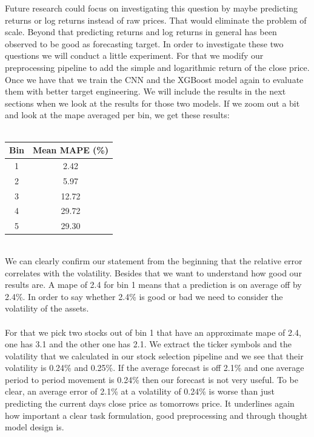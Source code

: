 \documentclass[a4paper,12pt]{report}
\begin{document}
Future research could focus on investigating this question by maybe predicting returns or log returns instead of raw prices. That would eliminate the problem of scale. Beyond that predicting returns and log returns in general has been observed to be good as forecasting target. In order to investigate these two questions we will conduct a little experiment. For that we modify our preprocessing pipeline to add the simple and logarithmic return of the close price. Once we have that we train the CNN and the XGBoost model again to evaluate them with better target engineering. We will include the results in the next sections when we look at the results for those two models. If we zoom out a bit and look at the mape averaged per bin, we get these results:\\\\
\begin{tabular}{|c|c|}
  \hline
  \textbf{Bin} & \textbf{Mean MAPE (\%)} \\
  \hline
  1 & 2.42 \\
  2 & 5.97 \\
  3 & 12.72 \\
  4 & 29.72 \\
  5 & 29.30 \\
  \hline
\end{tabular}\\

We can clearly confirm our statement from the beginning that the relative error correlates with the volatility. Besides that we want to understand how good our results are. A mape of 2.4 for bin 1 means that a prediction is on average off by 2.4\%. In order to say whether 2.4\% is good or bad we need to consider the volatility of the assets. \\\\

For that we pick two stocks out of bin 1 that have an approximate mape of 2.4, one has 3.1 and the other one has 2.1. We extract the ticker symbols and the volatility that we calculated in our stock selection pipeline and we see that their volatility is 0.24\% and 0.25\%. If the average forecast is off 2.1\% and one average period to period movement is 0.24\% then our forecast is not very useful. To be clear, an average error of 2.1\% at a volatility of 0.24\% is worse than just predicting the current days close price as tomorrows price. It underlines again how important a clear task formulation, good preprocessing and through thought model design is. 

\newpage
\end{document}
